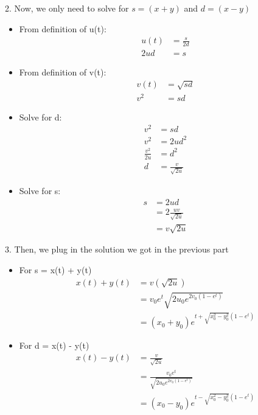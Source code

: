 \documentclass[12pt]{article}
\begin{document}
\begin{enumerate}
        2. Now, we only need to solve for $s = (x+y)$ and $d= (x-y)$
        \begin{itemize}
          \item From definition of u(t):
                \begin{align*}
                  u(t) & = \frac{s}{2d} \\
                  2ud  & = s
                \end{align*}
          \item  From definition of v(t):
                \begin{align*}
                  v(t) & = \sqrt{sd} \\
                  v^2  & = sd
                \end{align*}

          \item  Solve for d:
                \begin{align*}
                  v^2            & = sd                 \\
                  v^2            & = 2ud^2              \\
                  \frac{v^2}{2u} & = d^2                \\
                  d              & =\frac{v}{\sqrt{2u}}
                \end{align*}

          \item Solve for s:
                \begin{align*}
                  s & = 2ud                   \\
                    & = 2\frac{uv}{\sqrt{2u}} \\
                    & = v\sqrt{2u}
                \end{align*}
        \end{itemize}

        3. Then, we plug in the solution we got in the previous part
        \begin{itemize}
          \item For s = x(t) + y(t)
                \begin{align*}
                  x(t) + y(t) & = v(\sqrt{2u})                               \\
                              & = v_0e^t\sqrt{2u_0e^{2v_0(1-e^t)}}           \\
                              & = (x_0 + y_0)e^{t+\sqrt{x_0^2-y_0^2}(1-e^t)}
                \end{align*}
          \item  For d = x(t) - y(t)
                \begin{align*}
                  x(t) - y(t) & = \frac{v}{\sqrt{2u}}                        \\
                              & = \frac{v_0e^t}{\sqrt{2u_0e^{2v_0(1-e^t)}}}  \\
                              & = (x_0 - y_0)e^{t-\sqrt{x_0^2-y_0^2}(1-e^t)}
                \end{align*}
        \end{itemize}


\end{enumerate}
\end{document}
